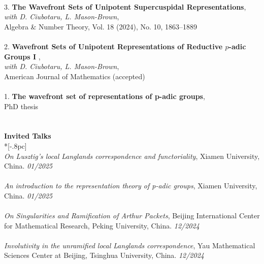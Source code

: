 \documentclass{article}
\begin{document}
\\
3. \textbf{The Wavefront Sets of Unipotent Supercuspidal Representations}, \\%
\textit{with D. Ciubotaru, L. Mason-Brown}, \\
Algebra \& Number Theory, Vol. 18 (2024), No. 10, 1863–1889 \\
\\
2. \textbf{Wavefront Sets of Unipotent Representations of Reductive $p$-adic Groups I} , \\%
\textit{with D. Ciubotaru, L. Mason-Brown}, \\
American Journal of Mathematics (accepted) \\
\\
1. \textbf{The wavefront set of representations of p-adic groups}, \\%
PhD thesis \\
\\
\\
{\large \bf Invited Talks} \\*[-.8pc]
\underline{\hspace{1.2in}} 
\\
{\it 
On Lusztig’s local Langlands correspondence and functoriality}, Xiamen University, China. \hfill {\it 01/2025\/} \\
\\
{\it 
An introduction to the representation theory of p-adic groups}, Xiamen University, China. \hfill {\it 01/2025\/} \\
\\
{\it 
On Singularities and Ramification of Arthur Packets}, Beijing International Center for Mathematical Research, Peking University, China. \hfill {\it 12/2024\/} \\
\\
{\it 
Involutivity in the unramified local Langlands correspondence}, Yau Mathematical Sciences Center at Beijing, Tsinghua University, China. \hfill {\it 12/2024\/} \\
\end{document}
